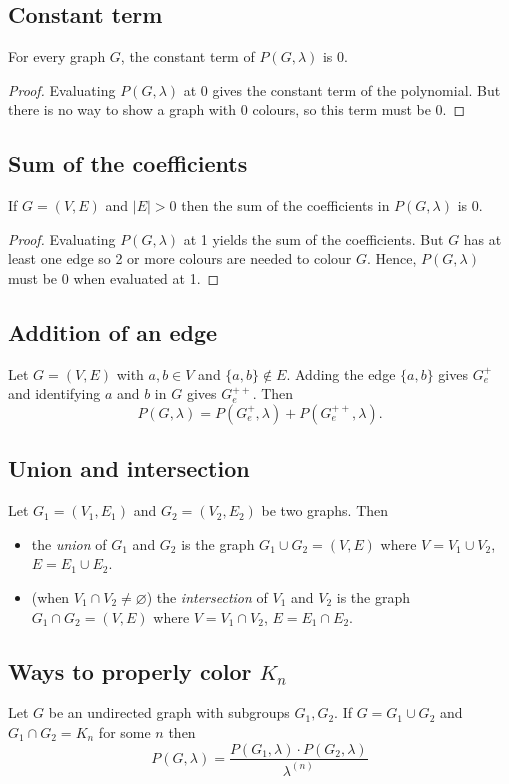 \documentclass[11pt]{article}
\let\emptyset\varnothing
\begin{document}
    \subsection{Constant term}

    For every graph $G$, the constant term of \(P(G, \lambda)\) is 0.
    \begin{proof}
        Evaluating \(P(G,\lambda)\) at 0 gives the constant term of the polynomial. But there is no way to show a graph with 0 colours, so this term must be 0.
    \end{proof}

    \subsection{Sum of the coefficients}

    If \(G = (V,E)\) and \(|E| > 0\) then the sum of the coefficients in \(P(G,\lambda)\) is 0.

    \begin{proof}
        Evaluating \(P(G, \lambda)\) at 1 yields the sum of the coefficients. But $G$ has at least one edge so 2 or more colours are needed to colour $G$. Hence, \(P(G,\lambda)\) must be 0 when evaluated at 1.
    \end{proof}

    \subsection{Addition of an edge}

    Let \(G = (V,E)\) with \(a,b \in V\) and \(\{a,b\} \notin E\). Adding the edge \(\{a,b\}\) gives \(G_e^+\) and identifying $a$ and $b$ in $G$ gives \(G_e^{++}\). Then \[P(G,\lambda) = P(G_e^+,\lambda) + P(G_e^{++},\lambda). \]

    \subsection{Union and intersection}

    Let \(G_1 = (V_1, E_1)\) and \(G_2 = (V_2, E_2)\) be two graphs. Then
    \begin{itemize}
        \item the \emph{union} of \(G_1\) and \(G_2\) is the graph \(G_1 \cup G_2 = (V,E)\) where \(V = V_1 \cup V_2\), \(E = E_1 \cup E_2\).
        \item (when \(V_1 \cap V_2 \neq \emptyset\)) the \emph{intersection} of \(V_1\) and \(V_2\) is the graph \(G_1 \cap G_2 = (V,E)\) where \(V = V_1 \cap V_2\), \(E = E_1 \cap E_2\).
    \end{itemize}

    \subsection{Ways to properly color \(K_n\)}

    Let $G$ be an undirected graph with subgroups \(G_1, G_2\). If \(G = G_1 \cup G_2\) and \(G_1 \cap G_2 = K_n\) for some $n$ then \[P(G,\lambda) = \frac{P(G_1, \lambda) \cdot P(G_2, \lambda)}{\lambda^{(n)}}\]
\end{document}

